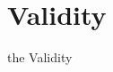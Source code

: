 \documentclass[../main.tex]{subfiles}
\begin{document}
\section{Validity}

the Validity
\end{document}
